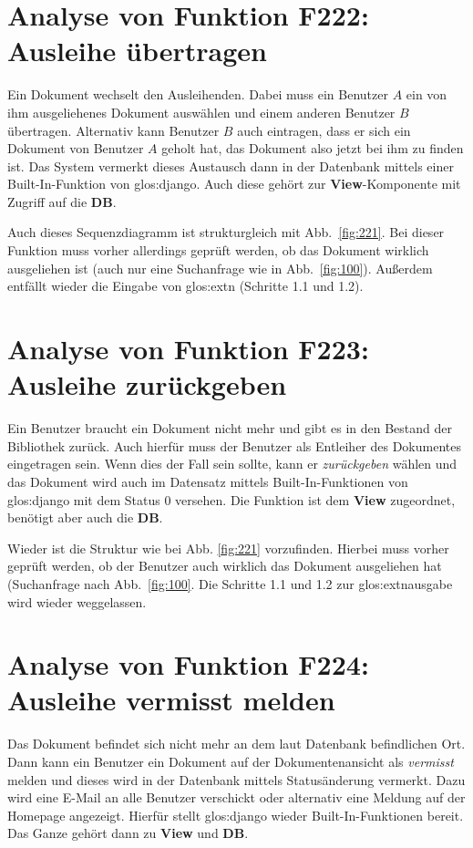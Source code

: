 \section{Analyse von Funktion F222: Ausleihe übertragen}
\label{f:222}
Ein Dokument wechselt den Ausleihenden. Dabei muss ein Benutzer $A$ ein von ihm ausgeliehenes Dokument auswählen und einem anderen Benutzer $B$ übertragen. Alternativ kann Benutzer $B$ auch eintragen, dass er sich ein Dokument von Benutzer $A$ geholt hat, das Dokument also jetzt bei ihm zu finden ist. Das System vermerkt dieses Austausch dann in der Datenbank mittels einer Built-In-Funktion von \gls{glos:django}. Auch diese gehört zur \textbf{View}-Komponente mit Zugriff auf die \textbf{DB}.

Auch dieses Sequenzdiagramm ist strukturgleich mit Abb.\ \ref{fig:221}. Bei dieser Funktion muss vorher allerdings geprüft werden, ob das Dokument wirklich ausgeliehen ist (auch nur eine Suchanfrage wie in Abb.\ \ref{fig:100}). Außerdem entfällt wieder die Eingabe von \gls{glos:ext}n (Schritte 1.1 und 1.2).

\section{Analyse von Funktion F223: Ausleihe zurückgeben}
\label{f:223}
Ein Benutzer braucht ein Dokument nicht mehr und gibt es in den Bestand der Bibliothek zurück. Auch hierfür muss der Benutzer als Entleiher des Dokumentes eingetragen sein. Wenn dies der Fall sein sollte, kann er \emph{zurückgeben} wählen und das Dokument wird auch im Datensatz mittels Built-In-Funktionen von \gls{glos:django} mit dem Status 0 versehen. Die Funktion ist dem \textbf{View} zugeordnet, benötigt aber auch die \textbf{DB}.

Wieder ist die Struktur wie bei Abb. \ref{fig:221} vorzufinden. Hierbei muss vorher geprüft werden, ob der Benutzer auch wirklich das Dokument ausgeliehen hat (Suchanfrage nach Abb.\ \ref{fig:100}. Die Schritte 1.1 und 1.2 zur \gls{glos:ext}nausgabe wird wieder weggelassen.

\section{Analyse von Funktion F224: Ausleihe vermisst melden}
\label{f:224}
Das Dokument befindet sich nicht mehr an dem laut Datenbank befindlichen Ort. Dann kann ein Benutzer ein Dokument auf der Dokumentenansicht als \emph{vermisst} melden und dieses wird in der Datenbank mittels Statusänderung vermerkt. Dazu wird eine E-Mail an alle Benutzer verschickt oder alternativ eine Meldung auf der Homepage angezeigt. Hierfür stellt \gls{glos:django} wieder Built-In-Funktionen bereit. Das Ganze gehört dann zu \textbf{View} und \textbf{DB}.

